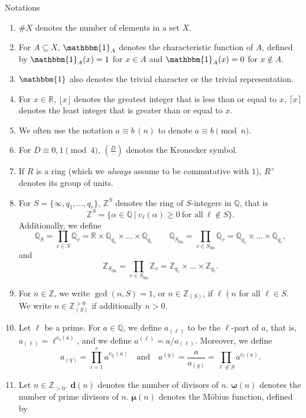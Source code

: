\documentclass[10pt,oneside,reqno]{amsart}
\makeatletter
\newcommand\QQ{\mathbb{Q}}
\newcommand\RR{\mathbb{R}}
\newcommand\ZZ{\mathbb{Z}}
\newcommand\triv{\mathbbm{1}}
\newcommand\fin{\mathrm{fin}}
\renewcommand\geq{\geqslant}
\newcommand\legendresymbol[2]{\genfrac{(}{)}{}{}{#1}{#2}}
\def\subsection{\@startsection{subsection}{2}
  \z@{3pt\@plus0pt}{-.5em}%
  {\normalfont\bfseries}}
\theoremstyle{THEOREM}
\theoremstyle{DEFINITION}
\theoremstyle{EXERCISE}
\numberwithin{equation}{section}
\makeatother
\begin{document}
\subsection{Notations}
\begin{enumerate}[itemsep=0pt,parsep=0pt,topsep=0pt,leftmargin=0pt,labelsep=3pt,itemindent=9pt,label=\textbullet]
  \item $\# X$ denotes the number of elements in a set $X$.
  \item For $A\subseteq X$, $\triv_A$ denotes the characteristic function of $A$, defined by $\triv_A(x)=1$ for $x\in A$ and $\triv_A(x)=0$ for $x\notin A$.
  \item $\triv$ also denotes the trivial character or the trivial representation.
  \item For $x\in \RR$, $\lfloor x\rfloor$ denotes the greatest integer that is less than or equal to $x$, $\lceil x\rceil$ denotes the least integer that is greater than or equal to $x$.
  \item We often use the notation $a\equiv b\,(n)$ to denote $a\equiv b\pmod n$.
  \item For $D\equiv 0,1\pmod 4$, $\legendresymbol{D}{\cdot}$ denotes the Kronecker symbol.
  \item If $R$ is a ring (which we \emph{always} assume to be commutative with $1$), $R^\times$ denotes its group of units.
  \item For $S=\{\infty, q_1,\dots,q_r\}$, $\ZZ^S$ denotes the ring of $S$-integers in $\QQ$, that is
    \[
    \ZZ^S=\{\alpha\in \QQ\ |\ v_\ell(\alpha)\geq 0\ \text{for all}\ \ell\notin S\}.
    \]
    Additionally, we define
    \[
    \QQ_S=\prod_{v\in S}\QQ_v=\RR\times \QQ_{q_1}\times\dots\times\QQ_{q_r}\qquad\QQ_{S_\fin}=\prod_{v\in S_\fin}\QQ_v=\QQ_{q_1}\times\dots\times\QQ_{q_r},
    \]
  and
    \[
    \ZZ_{S_\fin}=\prod_{v\in S_\fin}\ZZ_v=\ZZ_{q_1}\times\dots\times\ZZ_{q_r}.
    \]
  \item For $n\in \ZZ$, we write $\gcd(n,S)=1$, or $n\in \ZZ_{(S)}$, if 
  $\ell\nmid n$ for all $\ell\in S$.
  We write $n\in \ZZ_{(S)}^{>0}$ if additionally $n>0$.
  \item Let $\ell$ be a prime. For $a\in\QQ$, we define $a_{(\ell)}$ to be the $\ell$-part of $a$, that is, $a_{(\ell)}=\ell^{v_\ell(a)}$, and we define $a^{(\ell)}=a/a_{(\ell)}$. Moreover, we define 
  \[
    a_{(q)}=\prod_{i=1}^{r}a^{v_{q_i}(a)}\quad\text{and}\quad a^{(q)}=\frac{a}{a_{(q)}}=\prod_{\ell\notin S}a^{v_{\ell}(a)}.
  \]
  \item Let $n\in \ZZ_{>0}$. $\bm{d}(n)$ denotes the number of divisors of $n$. $\bm{\omega}(n)$ denotes the number of prime divisors of $n$. $\bm{\mu}(n)$ denotes the M\"obius function, defined by

\end{enumerate}
\end{document}
